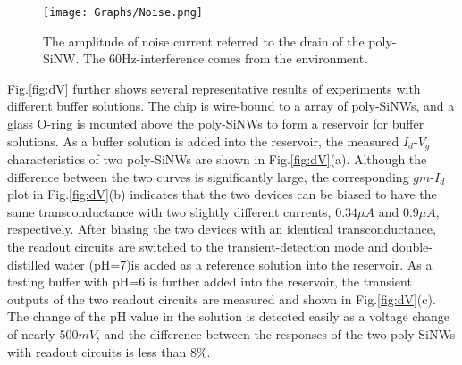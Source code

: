 \documentclass{article}
\begin{document}
\begin{figure}[!htb]
        \centering
        \texttt{[image: Graphs/Noise.png]}
    \caption{The amplitude of noise current referred to the drain of the poly-SiNW.
    The 60Hz-interference comes from the environment.}
    \label{fig:noise}
\end{figure}

Fig.\ref{fig:dV} further shows several representative results
of experiments with different buffer solutions.
The chip is wire-bound to a array of poly-SiNWs,
and a glass O-ring is mounted above the poly-SiNWs to form a reservoir for buffer solutions.
As a buffer solution is added into the reservoir,
the measured $I_{d}$-$V_{g}$ characteristics of two poly-SiNWs are shown in Fig.\ref{fig:dV}(a).
Although the difference between the two curves is significantly large,
the corresponding $gm$-$I_{d}$ plot in Fig.\ref{fig:dV}(b) indicates that the two devices
can be biased to have the same transconductance with two slightly different currents, $0.34\mu A$ and $0.9\mu A$, respectively.
After biasing the two devices with an identical transconductance,
the readout circuits are switched to the transient-detection mode
and double-distilled water (pH=7)is added as a reference solution into the reservoir.
As a testing buffer with pH=6 is further added into the reservoir,
the transient outputs of the two readout circuits are measured and shown in
 Fig.\ref{fig:dV}(c). The change of the pH value in the solution is detected easily
 as a voltage change of nearly $500 mV$, and the difference between the responses of the
 two poly-SiNWs with readout circuits is less than $8\%$.
\end{document}
